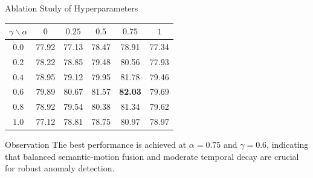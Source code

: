 \documentclass[aspectratio=169,xcolor=dvipsnames]{beamer}
\begin{document}
	
	\begin{frame}{Ablation Study of Hyperparameters}
		\scriptsize
		
		\begin{table}
			\centering
			\setlength{\tabcolsep}{5pt}
			\renewcommand{\arraystretch}{1.15}
			\begin{tabular}{c c c c c c}
				\hline
				$\gamma \backslash \alpha$ & $0$ & $0.25$ & $0.5$ & $0.75$ & $1$ \\
				\hline
				$0.0$ & 77.92 & 77.13 & 78.47 & 78.91 & 77.34 \\
				$0.2$ & 78.22 & 78.85 & 79.48 & 80.56 & 77.93 \\
				$0.4$ & 78.95 & 79.12 & 79.95 & 81.78 & 79.46 \\
				$0.6$ & 79.89 & 80.67 & 81.57 & \textbf{82.03} & 79.69 \\
				$0.8$ & 78.92 & 79.54 & 80.38 & 81.34 & 79.62 \\
				$1.0$ & 77.12 & 78.81 & 78.75 & 80.97 & 78.97 \\
				\hline
			\end{tabular}
		\end{table}
		
		\vspace{-0.5em}
		\begin{block}{Observation}
			The best performance is achieved at \textbf{$\alpha = 0.75$} and \textbf{$\gamma = 0.6$}, indicating that balanced semantic-motion fusion and moderate temporal decay are crucial for robust anomaly detection.
		\end{block}
		
	\end{frame}
	
\end{document}
